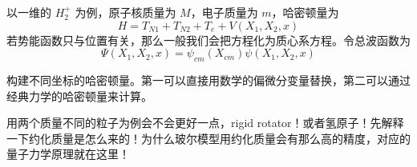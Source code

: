 
\begin{issues}
\issueDraft
\end{issues}

以一维的 $H_2^+$ 为例，原子核质量为 $M$，电子质量为 $m$，哈密顿量为
\begin{equation}
H = T_{N1} + T_{N2} + T_{e} + V(X_1,X_2,x)
\end{equation}
若势能函数只与位置有关，那么一般我们会把方程化为质心系方程。令总波函数为
\begin{equation}
\Psi(X_1,X_2,x) = \psi_{cm}(X_{cm})\psi(X_1,X_2,x)
\end{equation}

构建不同坐标的哈密顿量。第一可以直接用数学的偏微分变量替换，第二可以通过经典力学的哈密顿量来计算。

用两个质量不同的粒子为例会不会更好一点，rigid rotator！或者氢原子！先解释一下约化质量是怎么来的！为什么玻尔模型用约化质量会有那么高的精度，对应的量子力学原理就在这里！